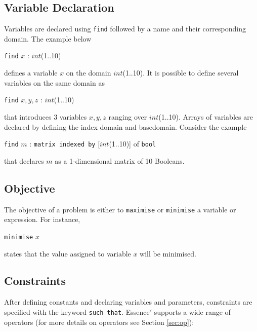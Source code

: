 \documentclass{article}
\begin{document}
\subsection{Variable Declaration}
Variables are declared using {\tt find} followed by a name and their
corresponding domain. The example below
\begin{center}
{\tt find}  $x$ : $int$(1..10)
\end{center}
defines a variable $x$ on the domain $int$(1..10).
It is possible to define several variables on the same domain as 
\begin{center}
{\tt find}  $x,y,z$ : $int$(1..10)
\end{center}
that introduces 3 variables $x,y,z$ ranging over $int$(1..10).
Arrays of variables are declared by defining the index domain and
basedomain. Consider the example
\begin{center}
{\tt find}  $m$ : {\tt matrix indexed by} [$int$(1..10)] of {\tt bool}
\end{center}
that declares $m$ as a 1-dimensional matrix of 10 Booleans. 


\subsection{Objective}
The objective of a problem is either to {\tt maximise} or 
{\tt minimise} a variable or expression. For instance,
\begin{center}
{\tt minimise} $x$
\end{center}
states that the value assigned to variable $x$ will be minimised.


\subsection{Constraints}
After defining constants and declaring variables and parameters,
constraints are specified with the keyword {\tt such that}.
 {\sc Essence}$'$ supports a wide range of operators (for more details
on operators see Section \ref{sec:op}):

\end{document}
